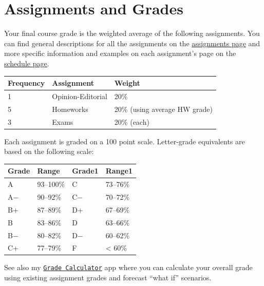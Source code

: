 \documentclass{article}
\begin{document}
\hypertarget{assignments-and-grades}{%
\section*{Assignments and Grades}\label{assignments-and-grades}}

Your final course grade is the weighted average of the following
assignments. You can find general descriptions for all the assignments
on the
\href{http://springS21.classes.ryansafner.com/assignments/}{assignments
page} and more specific information and examples on each assignment's
page on the
\href{http://springS21.classes.ryansafner.com/schedule/}{schedule page}.

\begin{center}

\begin{tabular}{lll}
\toprule
Frequency & Assignment & Weight\\
\midrule
1 & Opinion-Editorial & 20\%\\
5 & Homeworks & 20\% (using average HW grade)\\
3 & Exams & 20\% (each)\\
\bottomrule
\end{tabular}
\end{center}

Each assignment is graded on a 100 point scale. Letter-grade equivalents
are based on the following scale:

\begin{center}

\begin{tabular}{llll}
\toprule
Grade & Range & Grade1 & Range1\\
\midrule
A & 93–100\% & C & 73–76\%\\
A− & 90–92\% & C− & 70–72\%\\
B+ & 87–89\% & D+ & 67–69\%\\
B & 83–86\% & D & 63–66\%\\
B− & 80–82\% & D− & 60–62\%\\
\addlinespace
C+ & 77–79\% & F & < 60\%\\
\bottomrule
\end{tabular}
\end{center}

See also my
\href{https://ryansafner.shinyapps.io/306_grade_calculator/}{
\texttt{Grade\ Calculator}} app where you can calculate your overall
grade using existing assignment grades and forecast ``what if''
scenarios.
\end{document}
